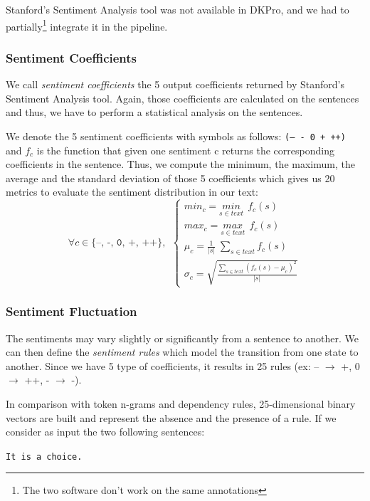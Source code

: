Stanford's Sentiment Analysis tool was not available in DKPro, and we had to partially\footnote{The two software don't work on the same annotations} integrate it in the pipeline.

\subsubsection{Sentiment Coefficients}
We call \emph{sentiment coefficients} the 5 output coefficients returned by Stanford's Sentiment Analysis tool. Again, those coefficients are calculated on the sentences and thus, we have to perform a statistical analysis on the sentences. 

We denote the 5 sentiment coefficients with symbols as follows: \texttt{(-- - 0 + ++)} and $f_{c}$ is the function that given one sentiment c returns the corresponding coefficients in the sentence. Thus, we compute the minimum, the maximum, the average and the standard deviation of those 5 coefficients which gives us 20 metrics to evaluate the sentiment distribution in our text:
\begin{equation*}
\forall c \in \texttt{\{--, -, 0, +, ++\}}, \: \:
\begin{cases}
min_c = \underset{s \in text}{min} \: \: f_c(s) \\
max_c = \underset{s \in text}{max} \: \: f_c(s) \\
\mu_c = \frac{1}{|s|} \; \displaystyle\sum_{s \in text} f_c(s) \\
\sigma_c = \sqrt{\frac{\displaystyle\sum_{s \in text} (f_c(s) - \mu_c)^2}{|s|}}
\end{cases}
\end{equation*} 

\subsubsection{Sentiment Fluctuation}
The sentiments may vary slightly or significantly from a sentence to another. We can then define the \emph{sentiment rules} which model the transition from one state to another. Since we have 5 type of coefficients, it results in 25 rules (ex: -- $\rightarrow$ +, 0 $\rightarrow$ ++, - $\rightarrow$ -). 

In comparison with token n-grams and dependency rules, 25-dimensional binary vectors are built and represent the absence and the presence of a rule. If we consider as input the two following sentences:

\texttt{It is a choice.} 

